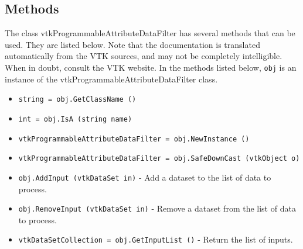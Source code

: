 \subsection{Methods}

The class vtkProgrammableAttributeDataFilter has several methods that can be used.
  They are listed below.
Note that the documentation is translated automatically from the VTK sources,
and may not be completely intelligible.  When in doubt, consult the VTK website.
In the methods listed below, \verb|obj| is an instance of the vtkProgrammableAttributeDataFilter class.
\begin{itemize}
\item  \verb|string = obj.GetClassName ()|

\item  \verb|int = obj.IsA (string name)|

\item  \verb|vtkProgrammableAttributeDataFilter = obj.NewInstance ()|

\item  \verb|vtkProgrammableAttributeDataFilter = obj.SafeDownCast (vtkObject o)|

\item  \verb|obj.AddInput (vtkDataSet in)| -  Add a dataset to the list of data to process.

\item  \verb|obj.RemoveInput (vtkDataSet in)| -  Remove a dataset from the list of data to process.

\item  \verb|vtkDataSetCollection = obj.GetInputList ()| -  Return the list of inputs.

\end{itemize}
